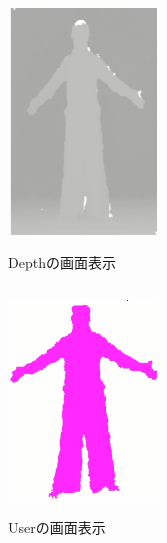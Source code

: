 \begin{figure}[p]
    \begin{minipage}{0.5\hsize}
     \begin{center}
      \includegraphics[width=4cm,height=6cm]{image/Depth.png}
     \end{center}
     \caption{Depthの画面表示}
     \label{depth}
    \end{minipage}
    \begin{minipage}{0.5\hsize}
     \begin{center}
      \includegraphics[width=4cm,height=6cm]{image/User.png}
     \end{center}
     \caption{Userの画面表示}
     \label{user}
    \end{minipage}
\end{figure}

\clearpage


